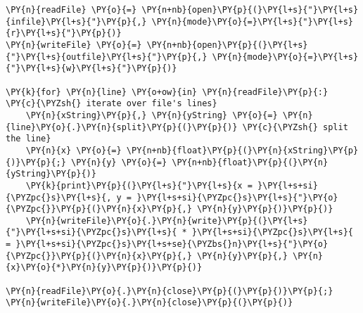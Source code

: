 \begin{Verbatim}[commandchars=\\\{\}]
\PY{n}{readFile} \PY{o}{=} \PY{n+nb}{open}\PY{p}{(}\PY{l+s}{"}\PY{l+s}{infile}\PY{l+s}{"}\PY{p}{,} \PY{n}{mode}\PY{o}{=}\PY{l+s}{"}\PY{l+s}{r}\PY{l+s}{"}\PY{p}{)} 
\PY{n}{writeFile} \PY{o}{=} \PY{n+nb}{open}\PY{p}{(}\PY{l+s}{"}\PY{l+s}{outfile}\PY{l+s}{"}\PY{p}{,} \PY{n}{mode}\PY{o}{=}\PY{l+s}{"}\PY{l+s}{w}\PY{l+s}{"}\PY{p}{)} 

\PY{k}{for} \PY{n}{line} \PY{o+ow}{in} \PY{n}{readFile}\PY{p}{:} \PY{c}{\PYZsh{} iterate over file's lines}
    \PY{n}{xString}\PY{p}{,} \PY{n}{yString} \PY{o}{=} \PY{n}{line}\PY{o}{.}\PY{n}{split}\PY{p}{(}\PY{p}{)} \PY{c}{\PYZsh{} split the line}
    \PY{n}{x} \PY{o}{=} \PY{n+nb}{float}\PY{p}{(}\PY{n}{xString}\PY{p}{)}\PY{p}{;} \PY{n}{y} \PY{o}{=} \PY{n+nb}{float}\PY{p}{(}\PY{n}{yString}\PY{p}{)}
    \PY{k}{print}\PY{p}{(}\PY{l+s}{"}\PY{l+s}{x = }\PY{l+s+si}{\PYZpc{}s}\PY{l+s}{, y = }\PY{l+s+si}{\PYZpc{}s}\PY{l+s}{"}\PY{o}{\PYZpc{}}\PY{p}{(}\PY{n}{x}\PY{p}{,} \PY{n}{y}\PY{p}{)}\PY{p}{)}
    \PY{n}{writeFile}\PY{o}{.}\PY{n}{write}\PY{p}{(}\PY{l+s}{"}\PY{l+s+si}{\PYZpc{}s}\PY{l+s}{ * }\PY{l+s+si}{\PYZpc{}s}\PY{l+s}{ = }\PY{l+s+si}{\PYZpc{}s}\PY{l+s+se}{\PYZbs{}n}\PY{l+s}{"}\PY{o}{\PYZpc{}}\PY{p}{(}\PY{n}{x}\PY{p}{,} \PY{n}{y}\PY{p}{,} \PY{n}{x}\PY{o}{*}\PY{n}{y}\PY{p}{)}\PY{p}{)}

\PY{n}{readFile}\PY{o}{.}\PY{n}{close}\PY{p}{(}\PY{p}{)}\PY{p}{;} \PY{n}{writeFile}\PY{o}{.}\PY{n}{close}\PY{p}{(}\PY{p}{)}
\end{Verbatim}
